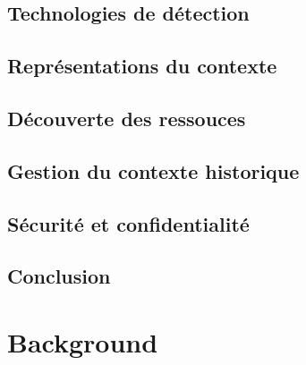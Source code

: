 \subsection{Technologies de détection}

\subsection{Représentations du contexte}

\subsection{Découverte des ressouces}

\subsection{Gestion du contexte historique}

\subsection{Sécurité et confidentialité}

\subsection{Conclusion}

% 

\section{Background}

